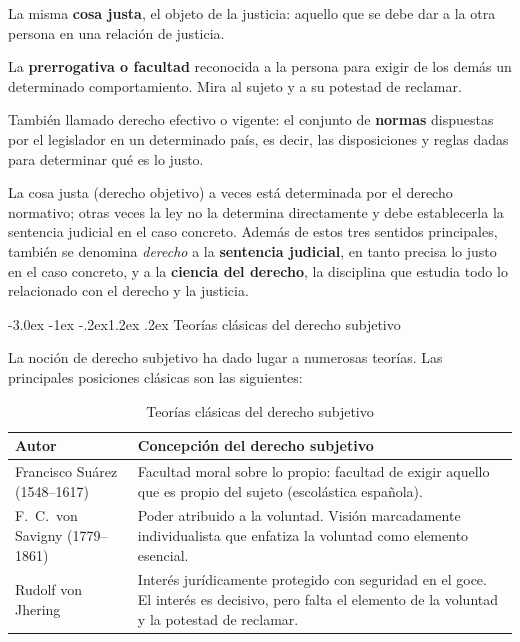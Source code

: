\documentclass[12pt,oneside]{book}
\makeatletter
\renewcommand\section{\@startsection{section}{1}{\z@}%
  {-3.0ex \@plus -1ex \@minus -.2ex}{1.2ex \@plus .2ex}%
  {\normalfont\large\bfseries\color{acento}}}
\makeatother
\begin{document}
\begin{definicion}
La misma \textbf{cosa justa}, el objeto de la justicia: aquello que se debe dar a la otra persona en una relación de justicia.
\end{definicion}

\begin{definicion}
La \textbf{prerrogativa o facultad} reconocida a la persona para exigir de los demás un determinado comportamiento. Mira al sujeto y a su potestad de reclamar.
\end{definicion}

\begin{definicion}
También llamado derecho efectivo o vigente: el conjunto de \textbf{normas} dispuestas por el legislador en un determinado país, es decir, las disposiciones y reglas dadas para determinar qué es lo justo.
\end{definicion}

La cosa justa (derecho objetivo) a veces está determinada por el derecho normativo; otras veces la ley no la determina directamente y debe establecerla la sentencia judicial en el caso concreto. Además de estos tres sentidos principales, también se denomina \textit{derecho} a la \textbf{sentencia judicial}, en tanto precisa lo justo en el caso concreto, y a la \textbf{ciencia del derecho}, la disciplina que estudia todo lo relacionado con el derecho y la justicia.

\section{Teorías clásicas del derecho subjetivo}

La noción de derecho subjetivo ha dado lugar a numerosas teorías. Las principales posiciones clásicas son las siguientes:

\begin{table}[H]
\centering
\begin{tabularx}{\textwidth}{B{0.27\textwidth} Y}
\toprule
\textbf{Autor} & \textbf{Concepción del derecho subjetivo} \\
\midrule
Francisco Suárez (1548--1617) & Facultad moral sobre lo propio: facultad de exigir aquello que es propio del sujeto (escolástica española). \\
F.~C.~von Savigny (1779--1861) & Poder atribuido a la voluntad. Visión marcadamente individualista que enfatiza la voluntad como elemento esencial. \\
Rudolf von Jhering & Interés jurídicamente protegido con seguridad en el goce. El interés es decisivo, pero falta el elemento de la voluntad y la potestad de reclamar. \\
\bottomrule
\end{tabularx}
\caption{Teorías clásicas del derecho subjetivo}
\end{table}
\end{document}
